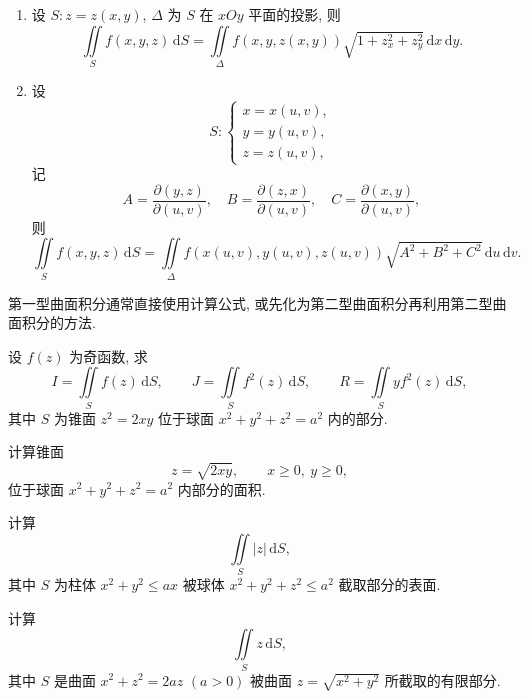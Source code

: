 \documentclass[../数学分析培优讲义.tex]{subfiles}
\begin{document}
\begin{theorem}[\markstar]
\begin{enumerate}[label=(\arabic*)]
    \item 设 $S:z=z(x,y)$, $\Delta$ 为 $S$ 在 $xOy$ 平面的投影, 则
    \[
        \iint\limits_S f(x,y,z)\,\mathrm{d}S
        =\iint\limits_\Delta f(x,y,z(x,y))\sqrt{1+z_x^2+z_y^2}\,\mathrm{d}x\,\mathrm{d}y.
    \]
    \item 设
    \[
        S:\begin{cases}
        x=x(u,v),\\
        y=y(u,v),\\
        z=z(u,v),
        \end{cases}
    \]
    记
    \[
        A=\dfrac{\partial(y,z)}{\partial(u,v)},\quad
        B=\dfrac{\partial(z,x)}{\partial(u,v)},\quad
        C=\dfrac{\partial(x,y)}{\partial(u,v)},
    \]
    则
    \[
        \iint\limits_Sf(x,y,z)\,\mathrm{d}S
        =\iint\limits_\Delta f(x(u,v),y(u,v),z(u,v))\sqrt{A^2+B^2+C^2}\,\mathrm{d}u\,\mathrm{d}v.
    \]
\end{enumerate}
\end{theorem}

\begin{remark}
第一型曲面积分通常直接使用计算公式, 或先化为第二型曲面积分再利用第二型曲面积分的方法.
\end{remark}

\begin{example}
设 $f(z)$ 为奇函数, 求
\[
    I=\iint\limits_Sf(z)\,\mathrm{d}S,\qquad
    J=\iint\limits_Sf^2(z)\,\mathrm{d}S,\qquad
    R=\iint\limits_Syf^2(z)\,\mathrm{d}S,
\]
其中 $S$ 为锥面 $z^2=2xy$ 位于球面 $x^2+y^2+z^2=a^2$ 内的部分.
\end{example}
\exampleblank

\begin{example}
计算锥面
\[
    z=\sqrt{2xy},\qquad x\geq0,\ y\geq0,
\]
位于球面 $x^2+y^2+z^2=a^2$ 内部分的面积.
\end{example}
\exampleblank

\begin{example}
计算
\[
    \iint\limits_S|z|\,\mathrm{d}S,
\]
其中 $S$ 为柱体 $x^2+y^2\leq ax$ 被球体 $x^2+y^2+z^2\leq a^2$ 截取部分的表面.
\end{example}
\exampleblank

\begin{example}
计算
\[
    \iint\limits_Sz\,\mathrm{d}S,
\]
其中 $S$ 是曲面 $x^2+z^2=2az$ $(a>0)$ 被曲面 $z=\sqrt{x^2+y^2}$ 所截取的有限部分.
\end{example}
\exampleblank
\end{document}
